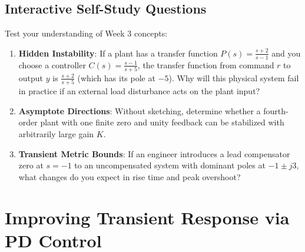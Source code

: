 \documentclass[12pt,onecolumn,twoside ]{article}
\begin{document}
	\subsection{Interactive Self-Study Questions}
	Test your understanding of Week 3 concepts:
	\begin{enumerate}
		\item
		\textbf{Hidden Instability}: If a plant has a transfer function $P(s) = \frac{s+2}{s-1}$ and you choose a controller $C(s) = \frac{s-1}{s+5}$, the transfer function from command $r$ to output $y$ is $\frac{s+2}{s+5}$ (which has its pole at $-5$). Why will this physical system fail in practice if an external load disturbance acts on the plant input?
		\item
		\textbf{Asymptote Directions}: Without sketching, determine whether a fourth-order plant with one finite zero and unity feedback can be stabilized with arbitrarily large gain $K$.
		\item
		\textbf{Transient Metric Bounds}: If an engineer introduces a lead compensator zero at $s = -1$ to an uncompensated system with dominant poles at $-1 \pm j3$, what changes do you expect in rise time and peak overshoot?
	\end{enumerate}
	
	\newpage
	\section{Improving Transient Response via PD Control}
\end{document}
